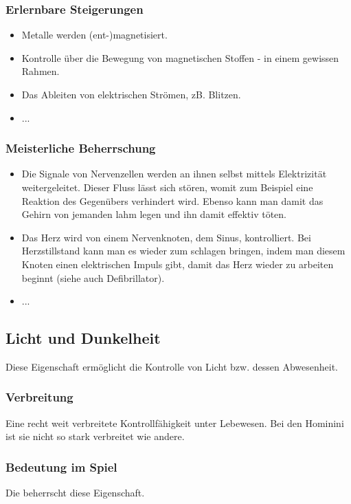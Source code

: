 \subsubsection{Erlernbare Steigerungen}
\begin{itemize}
	\item Metalle werden (ent-)magnetisiert.
	\item Kontrolle über die Bewegung von magnetischen Stoffen - in einem gewissen Rahmen.
	\item Das Ableiten von elektrischen Strömen, zB. Blitzen.
	\item ...
\end{itemize}

\subsubsection{Meisterliche Beherrschung} 
\begin{itemize}
	\item Die Signale von Nervenzellen werden an ihnen selbst mittels Elektrizität weitergeleitet. Dieser Fluss lässt sich stören, womit zum Beispiel eine Reaktion des Gegenübers verhindert wird. Ebenso kann man damit das Gehirn von jemanden lahm legen und ihn damit effektiv töten.
	\item Das Herz wird von einem Nervenknoten, dem Sinus, kontrolliert. Bei Herzstillstand kann man es wieder zum schlagen bringen, indem man diesem Knoten einen elektrischen Impuls gibt, damit das Herz wieder zu arbeiten beginnt (siehe auch Defibrillator).
	\item ...
\end{itemize}




\subsection{Licht und Dunkelheit} \label{sec:lichtmagie}
Diese Eigenschaft ermöglicht die Kontrolle von Licht bzw. dessen Abwesenheit.

\subsubsection{Verbreitung}
Eine recht weit verbreitete Kontrollfähigkeit unter Lebewesen. Bei den Hominini ist sie nicht so stark verbreitet wie andere.

\subsubsection{Bedeutung im Spiel}
Die  beherrscht diese Eigenschaft. 


